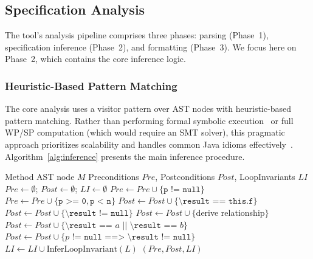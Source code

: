 \subsection{Specification Analysis}

The tool's analysis pipeline comprises three phases: parsing (Phase~1), specification inference (Phase~2), and formatting (Phase~3). We focus here on Phase~2, which contains the core inference logic.

\subsubsection{Heuristic-Based Pattern Matching}

The core analysis uses a visitor pattern over AST nodes with heuristic-based pattern matching. Rather than performing formal symbolic execution~\cite{king1976symbolic, cadar2008klee} or full WP/SP computation (which would require an SMT solver), this pragmatic approach prioritizes scalability and handles common Java idioms effectively~\cite{calcagno2015infer}. Algorithm~\ref{alg:inference} presents the main inference procedure.

\begin{algorithm}[t]
\caption{Specification Inference via Pattern Matching}
\label{alg:inference}
\begin{algorithmic}[1]
\REQUIRE Method AST node $M$
\ENSURE Preconditions $Pre$, Postconditions $Post$, LoopInvariants $LI$
\STATE $Pre \gets \emptyset$; $Post \gets \emptyset$; $LI \gets \emptyset$
\STATE {}
        \STATE $Pre \gets Pre \cup \{\texttt{p != null}\}$
        \STATE $Pre \gets Pre \cup \{\texttt{p >= 0}, \texttt{p < n}\}$
    \ENDIF
\ENDFOR
\STATE {}
        \STATE $Post \gets Post \cup \{\texttt{\textbackslash result == this.f}\}$
        \STATE $Post \gets Post \cup \{\texttt{\textbackslash result != null}\}$
        \STATE $Post \gets Post \cup \{$derive relationship$\}$
    \ENDIF
\ENDFOR
\STATE {}
        \STATE $Post \gets Post \cup \{\texttt{\textbackslash result == $a$ || \textbackslash result == $b$}\}$
        \STATE $Post \gets Post \cup \{\texttt{$p$ != null ==> \textbackslash result != null}\}$
    \ENDIF
\ENDFOR
\STATE {}
    \STATE $LI \gets LI \cup \text{InferLoopInvariant}(L)$
\ENDFOR
\RETURN $(Pre, Post, LI)$
\end{algorithmic}
\end{algorithm}

